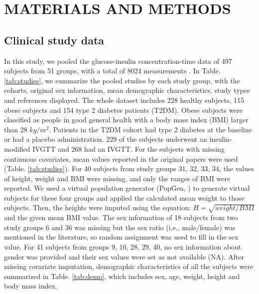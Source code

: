 \documentclass[utf8]{frontiersSCNS} %
\begin{document}
\section{MATERIALS AND METHODS}

\subsection{Clinical study data}
In this study, we pooled the glucose-insulin concentration-time data of 497 subjects from 51 groups, with a total of 8024 measurements . In Table. \ref{tab:studies}, we summarize the pooled studies by each study group, with the cohorts, original sex information, mean demographic characteristics, study types and references displayed. The whole dataset includes 228 healthy subjects, 115 obese subjects and 154 type 2 diabetes patients (T2DM). Obese subjects were classified as people in good general health with a body mass index (BMI) larger than 28 $kg/m^2$. Patients in the T2DM cohort had type 2 diabetes at the baseline or had a placebo administration. 229 of the subjects underwent an insulin-modified IVGTT and 268 had an IVGTT. For the subjects with missing continuous covariates, mean values reported in the original papers were used (Table. \ref{tab:studies}). For 40 subjects from study groups 31, 32, 33, 34, the values of height, weight and BMI were missing, and only the ranges of BMI were reported. We used a virtual population generator (PopGen, \cite{McNally2015}) to generate virtual subjects for these four groups and applied the calculated mean weight to those subjects. Then, the heights were imputed using the equation: $H=\sqrt{weight/BMI}$ and the given mean BMI value. The sex information of 18 subjects from two study groups 6 and 36 was missing but the sex ratio (i.e., male/female) was mentioned in the literature, so random assignment was used to fill in the sex value. For 41 subjects from groups 9, 10, 28, 29, 40, no sex information about gender was provided and their sex values were set as not available (NA). After missing covariate imputation, demographic characteristics of all the subjects were summarized in Table. \ref{tab:demo}, which includes sex, age, weight, height and body mass index. 
\end{document}
